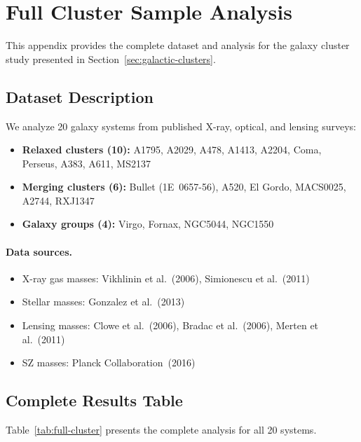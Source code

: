 
\section{Full Cluster Sample Analysis}\label{app:cluster-full}

This appendix provides the complete dataset and analysis for the galaxy cluster study presented in Section~\ref{sec:galactic-clusters}.

\subsection{Dataset Description}

We analyze 20 galaxy systems from published X-ray, optical, and lensing surveys:

\begin{itemize}
\item \textbf{Relaxed clusters (10):} A1795, A2029, A478, A1413, A2204, Coma, Perseus, A383, A611, MS2137
\item \textbf{Merging clusters (6):} Bullet (1E~0657-56), A520, El Gordo, MACS0025, A2744, RXJ1347
\item \textbf{Galaxy groups (4):} Virgo, Fornax, NGC5044, NGC1550
\end{itemize}

\paragraph{Data sources.}
\begin{itemize}
\item X-ray gas masses: Vikhlinin et al.~(2006), Simionescu et al.~(2011)
\item Stellar masses: Gonzalez et al.~(2013)
\item Lensing masses: Clowe et al.~(2006), Bradac et al.~(2006), Merten et al.~(2011)
\item SZ masses: Planck Collaboration~(2016)
\end{itemize}

\subsection{Complete Results Table}

Table~\ref{tab:full-cluster} presents the complete analysis for all 20 systems.

